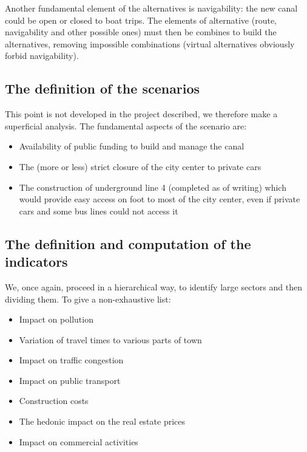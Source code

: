 Another fundamental element of the alternatives is navigability: the new canal could be open or closed to boat trips. The elements of alternative (route, navigability and other possible ones) must then be combines to build the alternatives, removing impossible combinations (virtual alternatives obviously forbid navigability).

\subsection{The definition of the scenarios}
\label{subsec:naviscenario}

This point is not developed in the project described, we therefore make a superficial analysis. The fundamental aspects of the scenario are:
\begin{itemize}
	\item Availability of public funding to build and manage the canal
	
	\item The (more or less) strict closure of the city center to private cars
	
	\item The construction of underground line 4 (completed as of writing) which would provide easy access on foot to most of the city center, even if private cars and some bus lines could not access it
\end{itemize}

\subsection{The definition and computation of the indicators}
\label{subsec:naviindicators}

We, once again, proceed in a hierarchical way, to identify large sectors and then dividing them. To give a non-exhaustive list:
\begin{itemize}
	\item Impact on pollution
	
	\item Variation of travel times to various parts of town
	
	\item Impact on traffic congestion
	
	\item Impact on public transport
	
	\item Construction costs
	
	\item The hedonic impact on the real estate prices
	
	\item Impact on commercial activities
\end{itemize}

